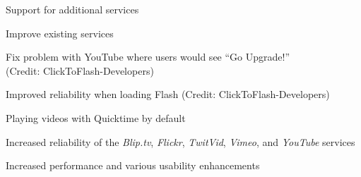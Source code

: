 \begin{changelog}
\item Support for additional services
\item Improve existing services
\end{changelog}

\begin{changelog}
\item Fix problem with YouTube where users would see ``Go Upgrade!''\\(Credit: ClickToFlash-Developers)
\item Improved reliability when loading Flash (Credit: ClickToFlash-Developers)
\item Playing videos with Quicktime by default
\item Increased reliability of the \emph{Blip.tv}, \emph{Flickr}, \emph{TwitVid}, \emph{Vimeo}, and \emph{YouTube} services
\item Increased performance and various usability enhancements
\end{changelog}
